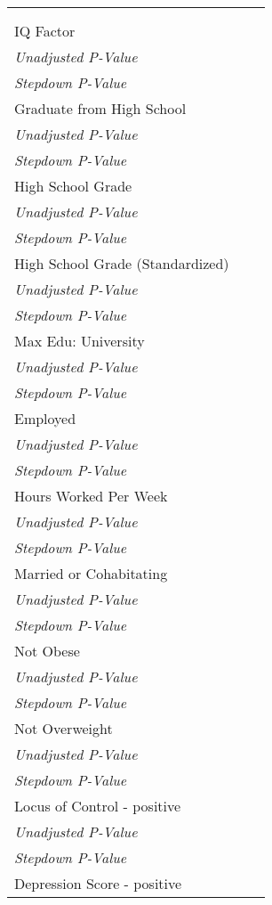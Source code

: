 \begin{tabular}{l c c}
\toprule
&  \\
  \\
\midrule
IQ Factor \\
\quad \textit{Unadjusted P-Value} \\
\quad \textit{Stepdown P-Value} \\
Graduate from High School \\
\quad \textit{Unadjusted P-Value} \\
\quad \textit{Stepdown P-Value} \\
High School Grade \\
\quad \textit{Unadjusted P-Value} \\
\quad \textit{Stepdown P-Value} \\
High School Grade (Standardized) \\
\quad \textit{Unadjusted P-Value} \\
\quad \textit{Stepdown P-Value} \\
Max Edu: University \\
\quad \textit{Unadjusted P-Value} \\
\quad \textit{Stepdown P-Value} \\
Employed \\
\quad \textit{Unadjusted P-Value} \\
\quad \textit{Stepdown P-Value} \\
Hours Worked Per Week \\
\quad \textit{Unadjusted P-Value} \\
\quad \textit{Stepdown P-Value} \\
Married or Cohabitating \\
\quad \textit{Unadjusted P-Value} \\
\quad \textit{Stepdown P-Value} \\
Not Obese \\
\quad \textit{Unadjusted P-Value} \\
\quad \textit{Stepdown P-Value} \\
Not Overweight \\
\quad \textit{Unadjusted P-Value} \\
\quad \textit{Stepdown P-Value} \\
Locus of Control - positive \\
\quad \textit{Unadjusted P-Value} \\
\quad \textit{Stepdown P-Value} \\
Depression Score - positive \\

\end{tabular}
